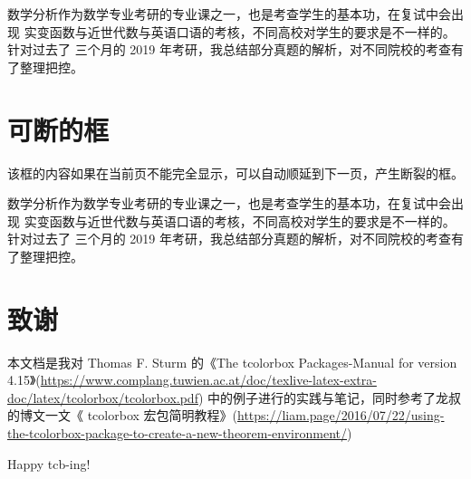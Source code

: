\documentclass{ctexart}
\begin{document}
\begin{tcolorbox}[enhanced,fit to height=2cm,
	colback=green!25!black!10!white,colframe=green!75!black,title=Fit box (5cm),
	drop fuzzy shadow,watermark color=white,watermark text=八一考研数学竞赛]
	数学分析作为数学专业考研的专业课之一，也是考查学生的基本功，在复试中会出现
	实变函数与近世代数与英语口语的考核，不同高校对学生的要求是不一样的。针对过去了
	三个月的 2019 年考研，我总结部分真题的解析，对不同院校的考查有了整理把控。
\end{tcolorbox}
\section{可断的框}
该框的内容如果在当前页不能完全显示，可以自动顺延到下一页，产生断裂的框。
\begin{tcolorbox}[enhanced jigsaw,breakable,pad at break*=1mm,
	colback=blue!5!white,colframe=blue!75!black,title=Breakable box,
	watermark color=white,watermark text=\Roman{tcbbreakpart}]
	数学分析作为数学专业考研的专业课之一，也是考查学生的基本功，在复试中会出现
	实变函数与近世代数与英语口语的考核，不同高校对学生的要求是不一样的。针对过去了
	三个月的 2019 年考研，我总结部分真题的解析，对不同院校的考查有了整理把控。
\end{tcolorbox}
\section{致谢}
本文档是我对 Thomas F. Sturm 的《The tcolorbox Packages-Manual for version 4.15》(\url{https://www.complang.tuwien.ac.at/doc/texlive-latex-extra-doc/latex/tcolorbox/tcolorbox.pdf}) 中的例子进行的实践与笔记，同时参考了龙叔的博文一文《 tcolorbox 宏包简明教程》(\url{https://liam.page/2016/07/22/using-the-tcolorbox-package-to-create-a-new-theorem-environment/})

Happy tcb-ing!
\end{document}
